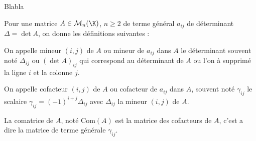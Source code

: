 \begin{theoreme}
    Blabla
\end{theoreme}
Pour une matrice $A\in\mathcal{M}_n(\K)$, $n\geq2$ de terme général $a_{ij}$ de déterminant $\Delta=\det A$, on donne les définitions suivantes :
\begin{defini}
On appelle mineur $(i,j)$ de $A$ ou mineur de $a_{ij}$ dans $A$ le déterminant souvent noté $\Delta_{ij}$ ou $(\det A)_{ij}$ qui correspond au déterminant de $A$ ou l'on à supprimé la ligne $i$ et la colonne $j$.
\end{defini}
\begin{defini}
On appelle cofacteur $(i,j)$ de $A$ ou  cofacteur de $a_{ij}$ dans $A$, souvent noté $\gamma_{ij}$ le scalaire  $\gamma_{ij}=(-1)^{i+j}\Delta_{ij}$ avec $\Delta_{ij}$ la mineur $(i,j)$ de $A$.
\end{defini}
\begin{defini}
La comatrice de $A$, noté $\text{Com}(A)$ est la matrice des cofacteurs de $A$, c'est a dire la matrice de terme générale $\gamma_{ij}$.
\end{defini}
